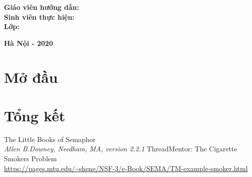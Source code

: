 \documentclass[12pt]{extreport}
\begin{document}
\begin{flushleft}
	\hspace{1.5 cm} \textbf{ Giáo viên hướng dẫn:\hspace{0.2cm}{ Họ và tên giảng viên}}\\[0.2cm]
	\hspace{1.5 cm} \textbf{ Sinh viên thực hiện\hspace{0.3cm}:}\\[0.2cm]
	\hspace{1.5 cm} \textbf{ Lớp\hspace{3.6cm}:\hspace{0.2cm}{ CTTN CNTT K63}}\\
\end{flushleft}

\vspace{1.0cm}
\begin{center}
	\textbf{{\large Hà Nội - 2020}}\\
\end{center}

\tableofcontents

\newpage
\chapter*{Mở đầu}

\chapter{}
\section{}
\subsection{}
\subsubsection{}

\chapter{Tổng kết}

\newpage
\begin{thebibliography}{12}
	The Little Books of Semaphor\\\textit{Allen B.Downey, Needham, MA, version 2.2.1}
	ThreadMentor: The Cigarette Smokers Problem\\ \url{https://pages.mtu.edu/~shene/NSF-3/e-Book/SEMA/TM-example-smoker.html}

\end{thebibliography}
\end{document}
